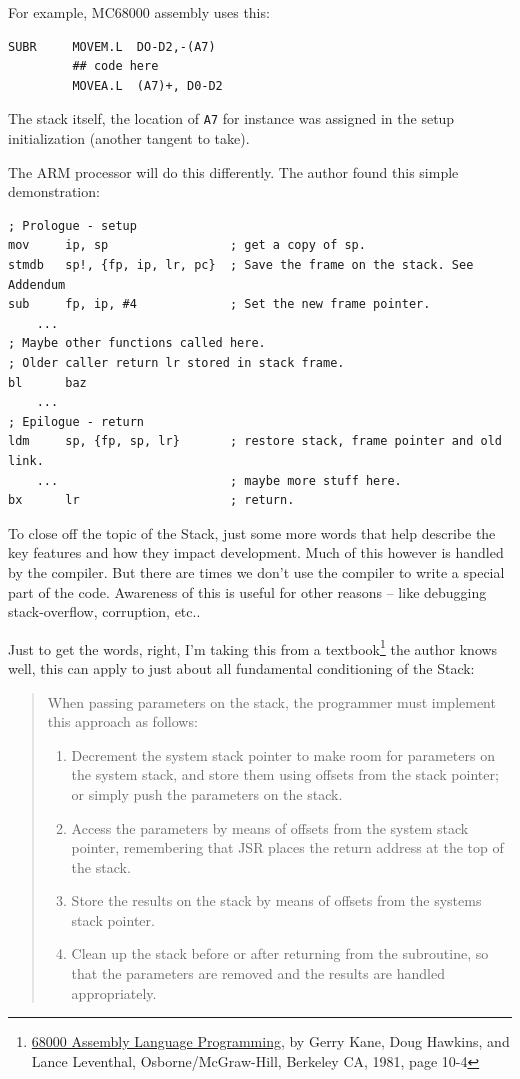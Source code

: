 \documentclass[12pt]{article}
\begin{document}
\begin{enumerate}
\begin{itemize}
\begin{itemize}
For example, MC68000 assembly uses this:

\begin{lstlisting}
SUBR	 MOVEM.L  DO-D2,-(A7)
         ## code here
         MOVEA.L  (A7)+, D0-D2
\end{lstlisting}

The stack itself, the location of {\texttt{A7}} for instance was assigned in the
setup initialization (another tangent to take).

The ARM processor will do this differently.  The author found this simple demonstration:

\begin{lstlisting}
; Prologue - setup
mov     ip, sp                 ; get a copy of sp.
stmdb   sp!, {fp, ip, lr, pc}  ; Save the frame on the stack. See Addendum
sub     fp, ip, #4             ; Set the new frame pointer.
    ...
; Maybe other functions called here.
; Older caller return lr stored in stack frame.
bl      baz
    ...
; Epilogue - return
ldm     sp, {fp, sp, lr}       ; restore stack, frame pointer and old link.
    ...                        ; maybe more stuff here.
bx      lr                     ; return.
\end{lstlisting}

To close off the topic of the Stack, just some more words that help describe the
key features and how they impact development.  Much of this however is handled by
the compiler.  But there are times we don't use the compiler to write a special part
of the code.  Awareness of this is useful for other reasons -- like debugging
stack-overflow, corruption, etc..

Just to get the words, right, I'm taking this from a 
textbook\footnote{{\underline{68000 Assembly Language Programming}}, by 
Gerry Kane, Doug Hawkins, and Lance Leventhal, Osborne/McGraw-Hill, Berkeley CA, 1981, 
page 10-4} the author knows
well, this can apply to just about all fundamental conditioning of the Stack:

\begin{quote}
When passing parameters on the stack, the programmer must implement this
approach as follows:
\begin{enumerate}
\item Decrement the system stack pointer to make room for parameters on the
system stack, and store them using offsets from the stack pointer; or simply
push the parameters on the stack.
\item Access the parameters by means of offsets from the system stack pointer,
remembering that JSR places the return address at the top of the stack.
\item Store the results on the stack by means of offsets from the systems stack
pointer.
\item Clean up the stack before or after returning from the subroutine, so that the
parameters are removed and the results are handled appropriately.
\end{enumerate}
\end{quote}



\end{itemize}
\end{itemize}
\end{enumerate}
\end{document}
